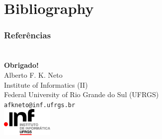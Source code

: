 \documentclass[professionalfonts]{beamer}
\begin{document}
\section*{Bibliography}

\begin{frame}[allowframebreaks]
  \frametitle{Referências}
  \footnotesize
  
  
\end{frame}

\section*{}

\begin{frame}[plain]
  \begin{center}
      \LARGE \textbf{Obrigado!} \normalsize \\[24pt]
      Alberto F. K. Neto\\
      \footnotesize
      \smallskip
      \color{InfGray}
      Institute of Informatics (II)\\
      Federal University of Rio Grande do Sul (UFRGS)\\
      \texttt{afkneto@inf.ufrgs.br}\\[8pt]
      \includegraphics[width=70pt]{inf-logo-white}
  \end{center}
\end{frame}
\end{document}
